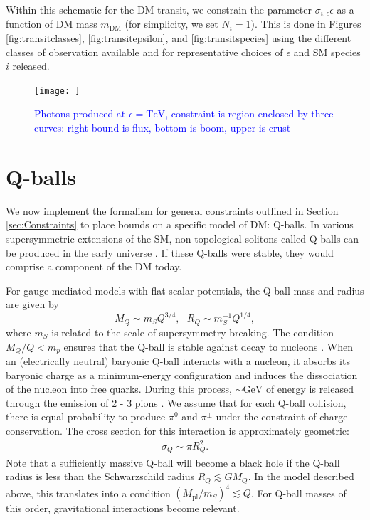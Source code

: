 \documentclass[twocolumn,showpacs,preprintnumbers,amsmath,amssymb,prd]{revtex4}
\begin{document}
Within this schematic for the DM transit, we constrain the parameter $\sigma_{i,\epsilon} \epsilon$ as a function of DM mass $m_\text{DM}$ (for simplicity, we set $N_i = 1$).
This is done in Figures \ref{fig:transitclasses}, \ref{fig:transitepsilon}, and \ref{fig:transitspecies} using the different classes of observation available and for representative choices of $\epsilon$ and SM species $i$ released.


\begin{figure}
\texttt{[image: ]}
\caption{\textcolor{blue}{Photons produced at $\epsilon = \text{TeV}$, constraint is region enclosed by three curves: right bound is flux, bottom is boom, upper is crust}}
\label{fig:}
\end{figure}

\section{Q-balls}
\label{sec:ConcreteExamples}

We now implement the formalism for general constraints outlined in Section \ref{sec:Constraints} to place bounds on a specific model of DM: Q-balls.
In various supersymmetric extensions of the SM, non-topological solitons called Q-balls can be produced in the early universe \cite{Coleman:1985ki, Kusenko:1997si}.
If these Q-balls were stable, they would comprise a component of the DM today.

For gauge-mediated models with flat scalar potentials, the Q-ball mass and radius are given by
\begin{equation}
\label{eq:Qballprop}
M_Q \sim m_S Q^{3/4}, ~~~ R_Q \sim m_S^{-1} Q^{1/4},
\end{equation}
where $m_S$ is related to the scale of supersymmetry breaking.
The condition $M_Q/Q < m_p$ ensures that the Q-ball is stable against decay to nucleons \cite{Dine:2003ax}.
When an (electrically neutral) baryonic Q-ball interacts with a nucleon, it absorbs its baryonic charge as a minimum-energy configuration and induces the dissociation of the nucleon into free quarks.
During this process, $\sim \text{GeV}$ of energy is released through the emission of 2 - 3 pions \cite{Dine:2003ax}.
We assume that for each Q-ball collision, there is equal probability to produce $\pi^0$ and $\pi^\pm$ under the constraint of charge conservation.
The cross section for this interaction is approximately geometric:
\begin{align}
\sigma_Q \sim \pi R_Q^2.
\end{align}
Note that a sufficiently massive Q-ball will become a black hole if the Q-ball radius is less than the Schwarzschild radius $R_Q \lesssim G M_Q$.
In the model described above, this translates into a condition $(M_\text{pl}/m_S)^4 \lesssim Q$.
For Q-ball masses of this order, gravitational interactions become relevant.
\end{document}
